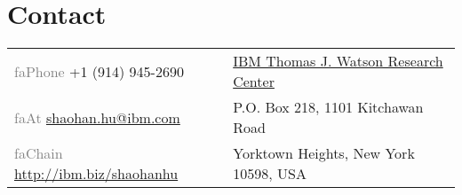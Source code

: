 
\section{\sc Contact}
\newcommand{\seticon}[1]{\textcolor{gray}{\csname #1\endcsname}}
\vspace{.01in}
\begin{tabular}{@{}p{3.3in}p{4in}}
\seticon{faPhone} +1 (914) 945-2690  & {\href{http://research.ibm.com/labs/watson/index.shtml}{IBM Thomas J. Watson Research Center}} \\
\seticon{faAt} {\href{mailto:shaohan.hu@ibm.com}{shaohan.hu@ibm.com}} & {P.O. Box 218, 1101 Kitchawan Road} \\
\seticon{faChain} {\url{http://ibm.biz/shaohanhu}} & Yorktown Heights, New York 10598, USA \\
\end{tabular}
